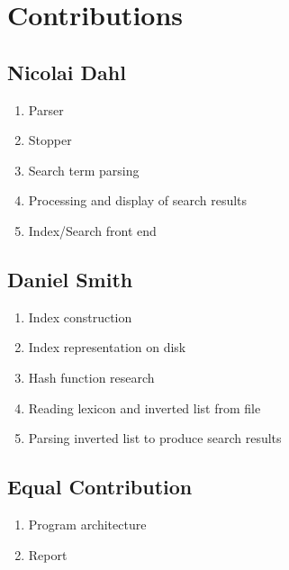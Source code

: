 \appendix
\label{sec:Appendix}

\section{Contributions}
\label{sec:contributions}

\subsection{Nicolai Dahl}
\begin{enumerate}
	\item Parser
	\item Stopper
	\item Search term parsing
	\item Processing and display of search results
	\item Index/Search front end
\end{enumerate}

\subsection{Daniel Smith}
\begin{enumerate}
	\item Index construction
	\item Index representation on disk
	\item Hash function research
	\item Reading lexicon and inverted list from file
	\item Parsing inverted list to produce search results
\end{enumerate}

\subsection{Equal Contribution}
\begin{enumerate}
	\item Program architecture
	\item Report
\end{enumerate}
